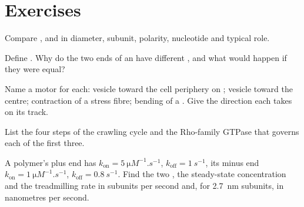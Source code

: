 \section{Exercises}

\begin{exercise}[$\star$]\label{exo:b3:cytoskeleton-motility:1}
Compare ,  and  in
diameter, subunit, polarity, nucleotide and typical role.
\end{exercise}

\begin{exercise}[$\star$]\label{exo:b3:cytoskeleton-motility:2}
Define . Why do the two ends of an  have different , and what would happen
if they were equal?
\end{exercise}

\begin{exercise}[$\star$]\label{exo:b3:cytoskeleton-motility:3}
Name a motor for each: vesicle toward the cell periphery on
; vesicle toward the centre; contraction of a stress
fibre; bending of a . Give the direction each takes on its track.
\end{exercise}

\begin{exercise}[$\star$]\label{exo:b3:cytoskeleton-motility:4}
List the four steps of the crawling cycle and the Rho-family GTPase
that governs each of the first three.
\end{exercise}

\begin{exercise}[$\star\star$]\label{exo:b3:cytoskeleton-motility:5}
A polymer's plus end has $k_{\text{on}} = \qty{5}{\micro M^{-1}.s^{-1}}$,
$k_{\text{off}} = \qty{1}{s^{-1}}$, its minus end $k_{\text{on}} =
\qty{1}{\micro M^{-1}.s^{-1}}$, $k_{\text{off}} = \qty{0.8}{s^{-1}}$.
Find the two , the steady-state concentration
and the treadmilling rate in subunits per second and, for
\qty{2.7}{nm} subunits, in nanometres per second.
\end{exercise}

